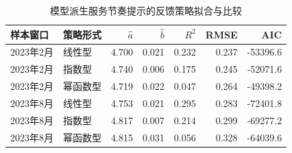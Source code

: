 \begin{table}[H]
\centering
\small
\caption{模型派生服务节奏提示的反馈策略拟合与比较}
\label{tab:feedback-estimates}
\begin{tabular}{llrrrrr}
\toprule
样本窗口 & 策略形式 & $\hat a$ & $\hat b$ & $R^2$ & RMSE & AIC \\
\midrule
2023年2月 & 线性型 & 4.700 & 0.021 & 0.232 & 0.237 & -53396.6 \\
2023年2月 & 指数型 & 4.740 & 0.006 & 0.175 & 0.245 & -52071.6 \\
2023年2月 & 幂函数型 & 4.719 & 0.022 & 0.047 & 0.264 & -49398.2 \\
2023年8月 & 线性型 & 4.753 & 0.021 & 0.295 & 0.283 & -72401.8 \\
2023年8月 & 指数型 & 4.817 & 0.007 & 0.214 & 0.299 & -69277.2 \\
2023年8月 & 幂函数型 & 4.815 & 0.031 & 0.056 & 0.328 & -64039.6 \\
\bottomrule
\end{tabular}
\end{table}
